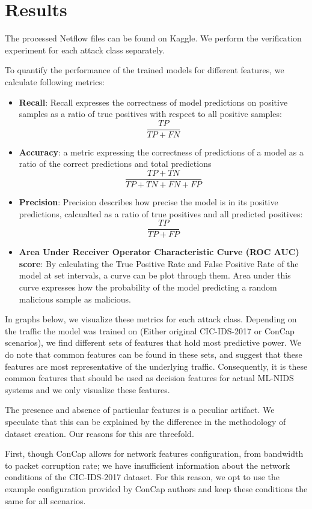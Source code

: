 \section{Results}
The processed Netflow files can be found on Kaggle. We perform the verification experiment for each attack class separately. 

To quantify the performance of the trained models for different features, we calculate following metrics:

\begin{itemize}
	\item \textbf{Recall}: Recall expresses the correctness of model predictions on positive samples as a ratio of true positives with respect to all positive samples: $$ \frac{TP}{TP+FN} $$
	\item \textbf{Accuracy}: a metric expressing the correctness of predictions of a model as a ratio of the correct predictions and total predictions $$\frac{TP + TN}{TP + TN + FN + FP} $$
	\item \textbf{Precision}: Precision describes how precise the model is in its positive predictions, calcualted as a ratio of true positives and all predicted positives: $$ \frac{TP}{TP+FP} $$
	\item \textbf{Area Under Receiver Operator Characteristic Curve (ROC AUC) score}: By calculating the True Positive Rate and False Positive Rate of the model at set intervals, a curve can be plot through them. Area under this curve expresses how the probability of the model predicting a random malicious sample as malicious. 
	
\end{itemize}

In graphs below, we visualize these metrics for each attack class. Depending on the traffic the model was trained on (Either original CIC-IDS-2017 or ConCap scenarios), we find different sets of features that hold most predictive power. We do note that common features can be found in these sets, and suggest that these features are most representative of the underlying traffic. Consequently, it is these common features that should be used as decision features for actual ML-NIDS systems and we only visualize these features. 

The presence and absence of particular features is a peculiar artifact. We speculate that this can be explained by the difference in the methodology of dataset creation. Our reasons for this are threefold. 

First, though ConCap allows for network features configuration, from bandwidth to packet corruption rate; we have insufficient information about the network conditions of the CIC-IDS-2017 dataset. For this reason, we opt to use the example configuration provided by ConCap authors and keep these conditions the same for all scenarios. 

